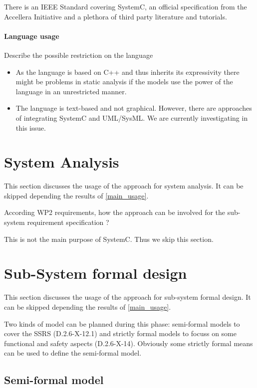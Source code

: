 There is an IEEE Standard covering SystemC, an official specification from the Accellera Initiative and a plethora of third party literature and tutorials.

\paragraph{Language usage} Describe the possible restriction on the language

\begin{itemize}
\item As the language is based on C++ and thus inherits its expressivity there might be problems in static analysis if the models use the power of the language in an unrestricted manner.
\item The language is text-based and not graphical. However, there are approaches of integrating SystemC and UML/SysML. We are currently investigating in this issue.
\end{itemize}


\section{System Analysis}
This section discusses the usage of the approach for system analysis.
It can be skipped depending the results of \ref{main_usage}.

According WP2 requirements, how the approach can be involved for the sub-system requirement specification ?

\begin{author_comment}
This is not the main purpose of SystemC. Thus we skip this section.
\end{author_comment}

\section{Sub-System formal design}
This section discusses the usage of the approach for sub-system formal design.
It can be skipped depending the results of \ref{main_usage}.

Two kinds of model can be planned during this phase: semi-formal models to  cover the SSRS (D.2.6-X-12.1) and strictly formal  models to  focuss on some functional and safety aspects (D.2.6-X-14).  Obviously some strictly  formal means can be used to define the semi-formal  model.

\subsection{Semi-formal model}

